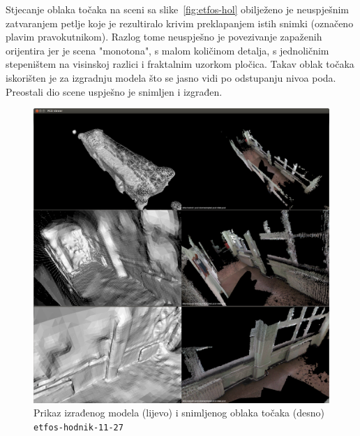 Stjecanje oblaka točaka na sceni sa slike~\ref{fig:etfos-hol} obilježeno
je neuspješnim zatvaranjem petlje koje je rezultiralo krivim
preklapanjem istih snimki (označeno plavim pravokutnikom). Razlog tome
neuspješno je povezivanje zapaženih orijentira jer je scena "monotona",
s malom količinom detalja, s jednoličnim stepeništem na visinskoj
razlici i fraktalnim uzorkom pločica. Takav oblak točaka iskorišten je
za izgradnju modela što se jasno vidi po odstupanju nivoa poda.
Preostali dio scene uspješno je snimljen i izgrađen.

\newpage
\begin{figure}[h]
\centering
\includegraphics[scale=0.25]{figures/04-etfos-hodnik1-vtk-pcd-all.png}
\caption{Prikaz izrađenog modela (lijevo) i snimljenog oblaka točaka
(desno) \texttt{etfos-hodnik-11-27}} 
\label{fig:04-etfos-hodnik-vtk-pcd-all.png}
\end{figure}



